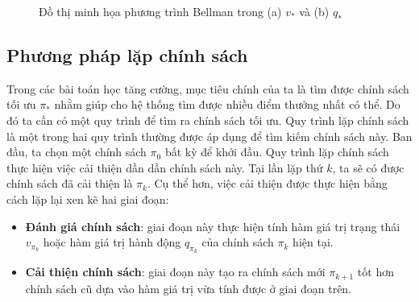 \begin{figure}
	\caption[Đồ thị minh họa phương trình Bellman trong hàm giá trị tối ưu]{Đồ thị minh họa phương trình Bellman trong (a) $v_{*}$ và (b) $q_{*}$}
	\label{fig:bellman_optimal_function}
\end{figure}

\subsection{Phương pháp lặp chính sách}
Trong các bài toán học tăng cường, mục tiêu chính của ta là tìm được chính sách tối ưu $\pi_{*}$ nhằm giúp cho hệ thống tìm được nhiều điểm thưởng nhất có thể. 
Do đó ta cần có một quy trình để tìm ra chính sách tối ưu. 
Quy trình lặp chính sách là một trong hai quy trình thường được áp dụng để tìm kiếm chính sách này. 
Ban đầu, ta chọn một chính sách $\pi_0$ bất kỳ để khởi đầu.
Quy trình lặp chính sách thực hiện việc cải thiện dần dần chính sách này.
Tại lần lặp thứ $k$, ta sẽ có được chính sách đã cải thiện là $\pi_k$.
Cụ thể hơn, việc cải thiện được thực hiện bằng cách lặp lại xen kẽ hai giai đoạn:
\begin{itemize}
	\item \textbf{Đánh giá chính sách}: giai đoạn này thực hiện tính hàm giá trị trạng thái $v_{\pi_k}$ hoặc hàm giá trị hành động $q_{\pi_k}$ của chính sách $\pi_k$ hiện tại.
	\item \textbf{Cải thiện chính sách}: giai đoạn này tạo ra chính sách mới $\pi_{k+1}$ tốt hơn chính sách cũ dựa vào hàm giá trị vừa tính được ở giai đoạn trên.
\end{itemize}


